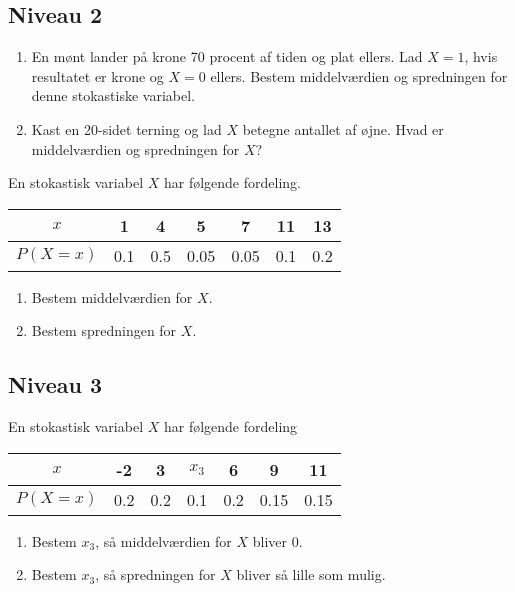 \subsection*{Niveau 2}

\begin{enumerate}[label=\roman*)]
	\item En mønt lander på krone 70 procent af tiden og plat ellers. Lad $X = 1$, hvis resultatet er krone og $X = 0 $ ellers. Bestem middelværdien og spredningen for denne stokastiske variabel. 
	\item Kast en 20-sidet terning og lad $X$ betegne antallet af øjne. Hvad er middelværdien og spredningen for $X$?
\end{enumerate}

En stokastisk variabel $X$ har følgende fordeling.
\begin{table}[H]
	\centering
	\begin{tabular}{c|c|c|c|c|c|c}
		$x$ & 1 & 4 & 5 & 7 & 11 & 13 \\
		\hline
		$P(X = x)$ & 0.1 & 0.5 & 0.05 & 0.05 & 0.1 & 0.2
	\end{tabular}
\end{table}

\begin{enumerate}[label=\roman*)]
	\item Bestem middelværdien for $X$.
	\item Bestem spredningen for $X$.
\end{enumerate}

\subsection*{Niveau 3}

En stokastisk variabel $X$ har følgende fordeling
\begin{table}[H]
	\centering
	\begin{tabular}{c|c|c|c|c|c|c}
		$x$ & -2 & 3 & $x_3$ & 6 & 9 & 11 \\
		\hline
		$P(X = x)$ & 0.2  & 0.2 & 0.1 & 0.2 & 0.15 & 0.15
	\end{tabular}
\end{table}

\begin{enumerate}[label=\roman*)]
	\item Bestem $x_3$, så middelværdien for $X$ bliver 0.
	\item Bestem $x_3$, så spredningen for $X$ bliver så lille som mulig. 
\end{enumerate}


